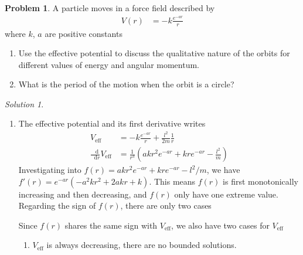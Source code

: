 \documentclass[twoside,11pt]{article}
\newcommand{\lms}{\fontfamily{lmss}\selectfont} %
\renewcommand*\d{\mathop{}\!\mathrm{d}}
\theoremstyle{definition}
\newtheorem{problem}{\lms Problem}
\theoremstyle{remark}
\newtheorem*{solution}{\lms Solution}
\begin{document}
\begin{problem}
A particle moves in a force field described by
\begin{align*}
    V(r) &= -k\frac{e^{-ar}}{r}
\end{align*}
where $k$, $a$ are positive constants
\begin{enumerate}[label=\alph*)]
    \item Use the effective potential to discuss the qualitative nature of the orbits for different values
    of energy and angular momentum.
    \item What is the period of the motion when the orbit is a circle?
\end{enumerate}
\end{problem}
\begin{solution}~
\begin{enumerate}[label=\alph*)]
\item The effective potential and its first derivative writes
\begin{align*}
    V_\text{eff} &= 
    -k\frac{e^{-ar}}{r} + \frac{l^2}{2m}\frac{1}{r}\\
    \frac{\d }{\d r} V_\text{eff} &=
    \frac{1}{r^3}\left(akr^2e^{-ar} + kre^{-ar} - \frac{l^2}{m}\right)
\end{align*}
Investigating into $f(r) = akr^2 e^{-ar} + kre^{-ar}-l^2/m$,
we have $f'(r) = e^{-ar}(-a^2kr^2 + 2akr + k)$.
This means $f(r)$ is first monotonically increasing and then decreasing,
and $f(r)$ only have one extreme value.
Regarding the sign of $f(r)$, there are only two cases
\begin{figure}[H]
    \centering
\end{figure}
Since $f(r)$ shares the same sign with $V_\text{eff}$,
we also have two cases for $V_\text{eff}$ 
\begin{enumerate}[label=\roman*.]
\item $V_\text{eff}$ is always decreasing, there are no bounded solutions.


\end{enumerate}
\end{enumerate}
\end{solution}
\end{document}
